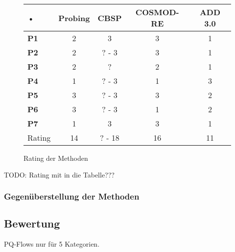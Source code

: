 \begin{figure}[h] %
\caption{Rating der Methoden}
\centering
\begin{tabular}{|l|c|c|c|c|}
\hline 
\rule[-1ex]{0pt}{2.5ex} • & \textbf{Probing} & \textbf{CBSP} & \textbf{COSMOD-RE} & \textbf{ADD 3.0} \\ 
\hline 
\rule[-1ex]{0pt}{2.5ex} \textbf{P1} & 2 & 3 & 3 & 1 \\ 
\hline 
\rule[-1ex]{0pt}{2.5ex} \textbf{P2} & 2 & ? - 3 & 3 & 1 \\ 
\hline 
\rule[-1ex]{0pt}{2.5ex} \textbf{P3} & 2 & ? & 2 & 1 \\ 
\hline 
\rule[-1ex]{0pt}{2.5ex} \textbf{P4} & 1 & ? - 3 & 1 & 3 \\ 
\hline 
\rule[-1ex]{0pt}{2.5ex} \textbf{P5} & 3 & ? - 3 & 3 & 2 \\ 
\hline 
\rule[-1ex]{0pt}{2.5ex} \textbf{P6} & 3 & ? - 3 & 1 & 2 \\ 
\hline 
\rule[-1ex]{0pt}{2.5ex} \textbf{P7} & 1 & 3 & 3 & 1 \\ 
\hline 
\hline 
\rule[-1ex]{0pt}{2.5ex} Rating & 14 & ? - 18 & 16 & 11 \\ 
\hline 
\end{tabular} 
\label{tab:method_rating}
\end{figure}

TODO: Rating mit in die Tabelle??? \\





\subsubsection{Gegenüberstellung der Methoden}





\subsection{Bewertung}



PQ-Flows nur für 5 Kategorien. \\